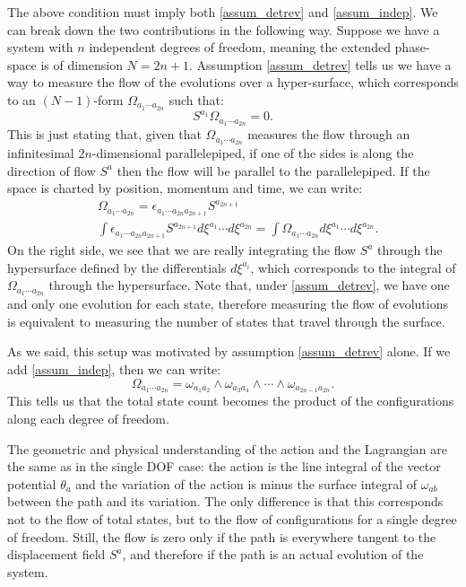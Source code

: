 The above condition must imply both \ref{assum_detrev} and \ref{assum_indep}. We can break down the two contributions in the following way. Suppose we have a system with $n$ independent degrees of freedom, meaning the extended phase-space is of dimension $N=2n+1$. Assumption \ref{assum_detrev} tells us we have a way to measure the flow of the evolutions over a hyper-surface, which corresponds to an $(N-1)$-form $\Omega_{a_1 \cdots a_{2n}}$ such that:
\begin{equation}
	S^{a_1} \Omega_{a_1 \cdots a_{2n}} = 0.
\end{equation}
This is just stating that, given that $\Omega_{a_1 \cdots a_{2n}}$ measures the flow through an infinitesimal $2n$-dimensional parallelepiped, if one of the sides is along the direction of flow $S^a$ then the flow will be parallel to the parallelepiped. If the space is charted by position, momentum and time, we can write:
\begin{equation}
	\begin{aligned}
	&\Omega_{a_1 \cdots a_{2n}} = \epsilon_{a_1 \cdots a_{2n}a_{2n+1}} S^{a_{2n+1}} \\
	&\int \epsilon_{a_1 \cdots a_{2n}a_{2n+1}} S^{a_{2n+1}} d\xi^{a_1}\cdots d\xi^{a_{2n}} = \int \Omega_{a_1 \cdots a_{2n}} d\xi^{a_1}\cdots d\xi^{a_{2n}}.
	\end{aligned}
\end{equation}
On the right side, we see that we are really integrating the flow $S^a$ through the hypersurface defined by the differentials $d\xi^{a_i}$, which corresponds to the integral of $\Omega_{a_1 \cdots a_{2n}}$ through the hypersurface. Note that, under \ref{assum_detrev}, we have one and only one evolution for each state, therefore measuring the flow of evolutions is equivalent to measuring the number of states that travel through the surface.

As we said, this setup was motivated by assumption \ref{assum_detrev} alone. If we add \ref{assum_indep}, then we can write:
\begin{equation}
	\Omega_{a_1 \cdots a_{2n}} = \omega_{a_1 a_2} \wedge \omega_{a_3 a_4} \wedge \cdots \wedge \omega_{a_{2n-1} a_{2n}}.
\end{equation}
This tells us that the total state count becomes the product of the configurations along each degree of freedom.

The geometric and physical understanding of the action and the Lagrangian are the same as in the single DOF case: the action is the line integral of the vector potential $\theta_a$ and the variation of the action is minus the surface integral of $\omega_{ab}$ between the path and its variation. The only difference is that this corresponds not to the flow of total states, but to the flow of configurations for a single degree of freedom. Still, the flow is zero only if the path is everywhere tangent to the displacement field $S^a$, and therefore if the path is an actual evolution of the system.


